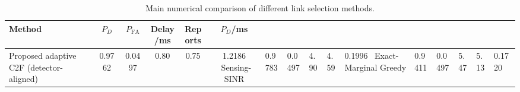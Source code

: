 \begin{table}[t]
    \centering
    \caption{Main numerical comparison of different link selection methods.}
    \label{tab:main_summary}
    \begin{tabular}{l c c c c c}
        \hline
        Method & $P_D$ & $P_{\mathrm{FA}}$ & Delay/ms & Reports & $P_D$/ms \\
        \hline
        Proposed adaptive C2F (detector-aligned) & 0.9762 & 0.0497 & 0.80 & 0.75 & 1.2186 \
        Sensing-SINR & 0.9783 & 0.0497 & 4.90 & 4.59 & 0.1996 \
        Exact-Marginal Greedy & 0.9411 & 0.0497 & 5.47 & 5.13 & 0.1720 \
        \hline
    \end{tabular}
\end{table}
